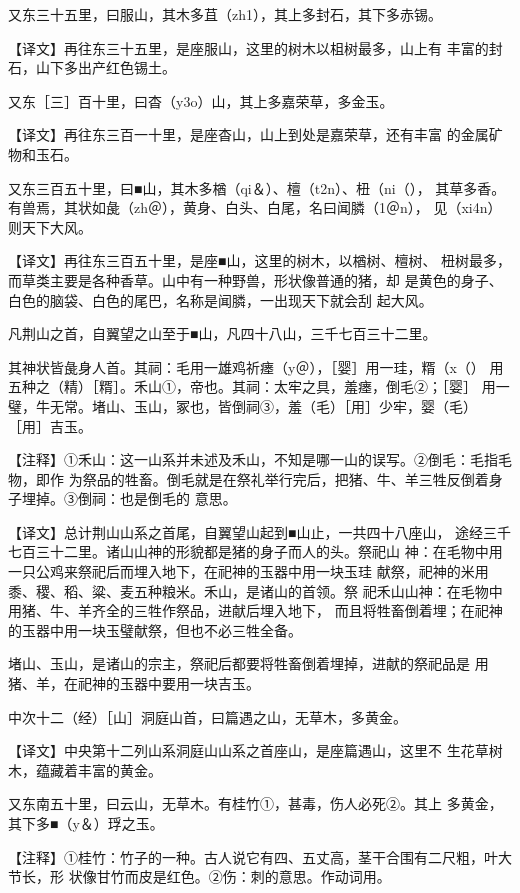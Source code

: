 \documentclass[a4paper,12pt,UTF8,twoside]{ctexbook}
\begin{document}
又东三十五里，曰服山，其木多苴（zh1），其上多封石，其下多赤锡。

【译文】再往东三十五里，是座服山，这里的树木以柤树最多，山上有 丰富的封石，山下多出产红色锡土。

又东［三］百十里，曰杳（y3o）山，其上多嘉荣草，多金玉。

【译文】再往东三百一十里，是座杳山，山上到处是嘉荣草，还有丰富 的金属矿物和玉石。

又东三百五十里，曰■山，其木多楢（qi＆）、檀（t2n）、杻（ni（）， 其草多香。有兽焉，其状如彘（zh＠），黄身、白头、白尾，名曰闻膦（1＠n）， 见（xi4n）则天下大风。

【译文】再往东三百五十里，是座■山，这里的树木，以楢树、檀树、 杻树最多，而草类主要是各种香草。山中有一种野兽，形状像普通的猪，却 是黄色的身子、白色的脑袋、白色的尾巴，名称是闻膦，一出现天下就会刮 起大风。

凡荆山之首，自翼望之山至于■山，凡四十八山，三千七百三十二里。

其神状皆彘身人首。其祠：毛用一雄鸡祈瘗（y＠），［婴］用一珪，糈（x（） 用五种之（精）［糈］。禾山①，帝也。其祠：太牢之具，羞瘗，倒毛②；［婴］ 用一璧，牛无常。堵山、玉山，冢也，皆倒祠③，羞（毛）［用］少牢，婴（毛） ［用］吉玉。

【注释】①禾山：这一山系并未述及禾山，不知是哪一山的误写。②倒毛：毛指毛物，即作 为祭品的牲畜。倒毛就是在祭礼举行完后，把猪、牛、羊三牲反倒着身子埋掉。③倒祠：也是倒毛的 意思。

【译文】总计荆山山系之首尾，自翼望山起到■山止，一共四十八座山， 途经三千七百三十二里。诸山山神的形貌都是猪的身子而人的头。祭祀山 神：在毛物中用一只公鸡来祭祀后而埋入地下，在祀神的玉器中用一块玉珪 献祭，祀神的米用黍、稷、稻、粱、麦五种粮米。禾山，是诸山的首领。祭 祀禾山山神：在毛物中用猪、牛、羊齐全的三牲作祭品，进献后埋入地下， 而且将牲畜倒着埋；在祀神的玉器中用一块玉璧献祭，但也不必三牲全备。

堵山、玉山，是诸山的宗主，祭祀后都要将牲畜倒着埋掉，进献的祭祀品是 用猪、羊，在祀神的玉器中要用一块吉玉。

中次十二（经）［山］洞庭山首，曰篇遇之山，无草木，多黄金。

【译文】中央第十二列山系洞庭山山系之首座山，是座篇遇山，这里不 生花草树木，蕴藏着丰富的黄金。

又东南五十里，曰云山，无草木。有桂竹①，甚毒，伤人必死②。其上 多黄金，其下多■（y＆）琈之玉。

【注释】①桂竹：竹子的一种。古人说它有四、五丈高，茎干合围有二尺粗，叶大节长，形 状像甘竹而皮是红色。②伤：刺的意思。作动词用。
\end{document}
